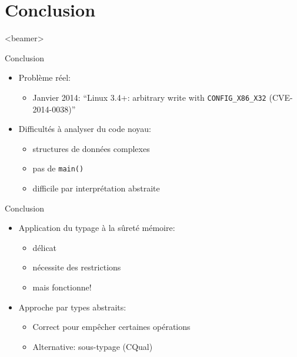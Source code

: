 \section{Conclusion}
  \begin{frame}<beamer>
   \tableofcontents[currentsection]
 \end{frame}



\begin{frame}{Conclusion}
    \begin{itemize}
    \item Problème réel:
        \begin{itemize}
            \item Janvier 2014:
                \enquote{Linux 3.4+: arbitrary write with \texttt{CONFIG\_X86\_X32} (CVE-2014-0038)}
        \end{itemize}
    \item Difficultés à analyser du code noyau:
        \begin{itemize}
            \item structures de données complexes
            \item pas de \texttt{main()}
            \item difficile par interprétation abstraite
        \end{itemize}
    \end{itemize}
\end{frame}

\begin{frame}{Conclusion}
    \begin{itemize}
    \item Application du typage à la sûreté mémoire:
        \begin{itemize}
            \item délicat
            \item nécessite des restrictions
            \item mais fonctionne!
        \end{itemize}
    \item Approche par types abstraits:
        \begin{itemize}
            \item Correct pour empêcher certaines opérations
            \item Alternative: sous-typage (CQual)
        \end{itemize}
    \end{itemize}
\end{frame}

